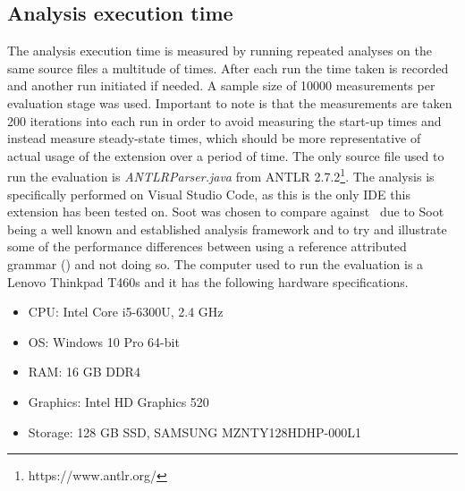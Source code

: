 \documentclass[sigplan,10pt]{acmart}
\begin{document}
\subsection{Analysis execution time}
The analysis execution time is measured by running repeated analyses on the same source files a multitude of times. After each run the time taken is recorded and another run initiated if needed. A sample size of 10000 measurements per evaluation stage was used. Important to note is that the measurements are taken 200 iterations into each run in order to avoid measuring the start-up times and instead measure steady-state times, which should be more representative of actual usage of the extension over a period of time. The only source file used to run the evaluation is  \textit{ANTLRParser.java} from ANTLR 2.7.2\footnote{https://www.antlr.org/}. The analysis is specifically performed on Visual Studio Code, as this is the only IDE this extension has been tested on. Soot \cite{soot} was chosen to compare against \intraj\ due to Soot being a well known and established analysis framework and to try and illustrate some of the performance differences between using a reference attributed grammar (\intraj) and not doing so. The computer used to run the evaluation is a Lenovo Thinkpad T460s and it has the following hardware specifications.

\begin{itemize}
    \item CPU: Intel Core i5-6300U, 2.4 GHz
    \item OS: Windows 10 Pro 64-bit
    \item RAM: 16 GB DDR4
    \item Graphics: Intel HD Graphics 520
    \item Storage: 128 GB SSD, SAMSUNG MZNTY128HDHP-000L1
\end{itemize}
\end{document}
